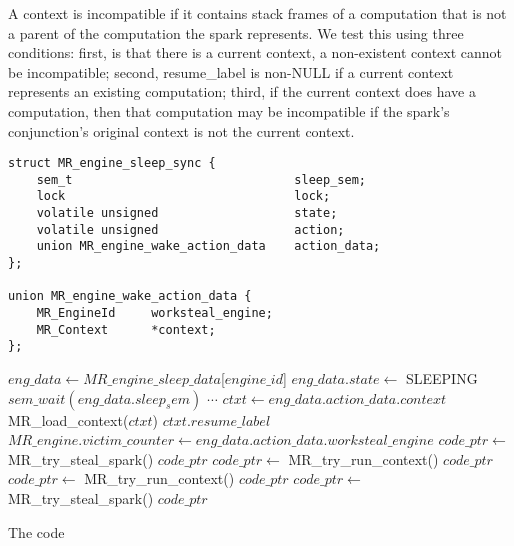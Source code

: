 A context is incompatible if it contains stack frames of a computation that
is not a parent of the computation the spark represents.
We test this using three conditions:
first, is that there is a current context, a non-existent context cannot
be incompatible;
second, resume\_label is non-NULL if a current context represents an
existing computation;
third, if the current context does have a computation, then that computation
may be incompatible if the spark's conjunction's original context is not the
current context.

\begin{algorithm}[tbp]
\begin{minipage}{\textwidth}
\begin{verbatim}
struct MR_engine_sleep_sync {
    sem_t                               sleep_sem;
    lock                                lock;
    volatile unsigned                   state;
    volatile unsigned                   action;
    union MR_engine_wake_action_data    action_data;
};

union MR_engine_wake_action_data {
    MR_EngineId     worksteal_engine;
    MR_Context      *context;
};
\end{verbatim}

\begin{algorithmic}
        \Loop
            \State $eng\_data \gets MR\_engine\_sleep\_data$[$engine\_id$]
            \State $eng\_data.state \gets$ SLEEPING
            \State $sem\_wait(eng\_data.sleep_sem)$
                \State $\cdots$
              \EndCase
                \State $ctxt \gets eng\_data.action\_data.context$
                \State MR\_load\_context($ctxt$)
                \Goto $ctxt.resume\_label$
              \EndCase
                \State $MR\_engine.victim\_counter \gets
                    eng\_data.action\_data.worksteal\_engine$
                \State $code\_ptr \gets$ MR\_try\_steal\_spark()
                    \Goto $code\_ptr$
                \EndIf
                \State $code\_ptr \gets$ MR\_try\_run\_context()
                    \Goto $code\_ptr$
                \EndIf
                \State \Break
              \EndCase
                \State $code\_ptr \gets$ MR\_try\_run\_context()
                    \Goto $code\_ptr$
                \EndIf
                \State $code\_ptr \gets$ MR\_try\_steal\_spark()
                    \Goto $code\_ptr$
                \EndIf
                \State \Break
              \EndCase
            \EndSwitch
        \EndLoop
    \EndProcedure
\end{algorithmic}

\end{minipage}
\caption{The \sleep code}
\end{algorithm}

